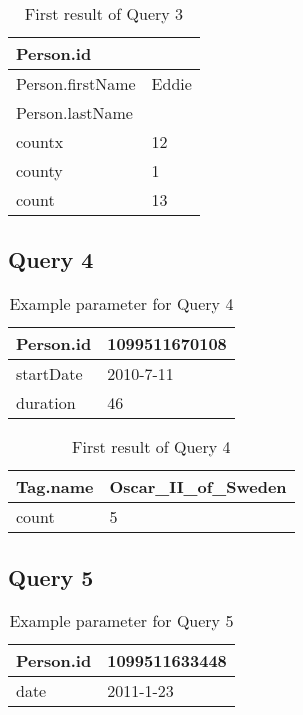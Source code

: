 \begin{table}[H]
    \begin{tabular}{|p{8cm}|p{8cm}|}
        \hline
        Person.id & \\
        \hline
        Person.firstName & Eddie \\
        \hline
        Person.lastName &   \\
        \hline
        countx & 12 \\
        \hline
        county & 1 \\
        \hline
        count &  13 \\ 
        \hline
    \end{tabular}
    \caption{First result of Query 3}
\end{table}

\subsection{Query 4}

\begin{table}[H]
    \begin{tabular}{|l|l|}
        \hline
        Person.id & 1099511670108 \\
        \hline
        startDate & 2010-7-11 \\
        \hline
        duration & 46 \\
        \hline
    \end{tabular}
    \caption{Example parameter for Query 4}
\end{table}

\begin{table}[H]
    \begin{tabular}{|p{8cm}|p{8cm}|}
        \hline
        Tag.name & Oscar\_II\_of\_Sweden\\
        \hline
        count & 5 \\
        \hline
    \end{tabular}
    \caption{First result of Query 4}
\end{table}

\subsection{Query 5}

\begin{table}[H]
    \begin{tabular}{|l|l|}
        \hline
        Person.id & 1099511633448 \\
        \hline
        date &  2011-1-23 \\
        \hline
    \end{tabular}
    \caption{Example parameter for Query 5}
\end{table}


